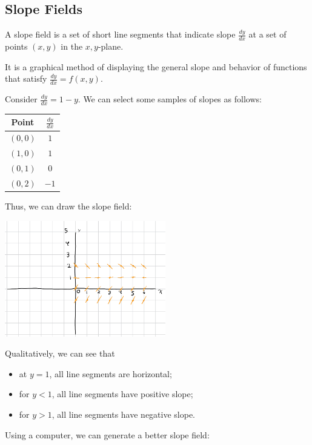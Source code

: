 \documentclass[10pt]{mypackage}
\begin{document}
\subsection{Slope Fields}%
\begin{definition}
  A slope field is a set of short line segments that indicate slope $\frac{dy}{dx}$ at a set of points $(x,y)$ in the $x,y$-plane.\newline

  It is a graphical method of displaying the general slope and behavior of functions that satisfy $\frac{dy}{dx} = f(x,y)$.
\end{definition}
\begin{example}
  Consider $\frac{dy}{dx} = 1-y$. We can select some samples of slopes as follows:
  \begin{center}
    \begin{tabular}{c|c}
      Point & $\frac{dy}{dx}$\\
      \hline
      $(0,0)$ & $1$\\
      $(1,0)$ & $1$\\
      $(0,1)$ & $0$\\
      $(0,2)$ & $-1$
    \end{tabular}
  \end{center}
  Thus, we can draw the slope field:
  \begin{center}
    \includegraphics[width=7cm]{images/slope_field_2.png}
  \end{center}
  Qualitatively, we can see that
  \begin{itemize}
    \item at $y = 1$, all line segments are horizontal;
    \item for $y < 1$, all line segments have positive slope;
    \item for $y > 1$, all line segments have negative slope.
  \end{itemize}
  Using a computer, we can generate a better slope field:
  \begin{center}

\end{center}
\end{example}
\end{document}
